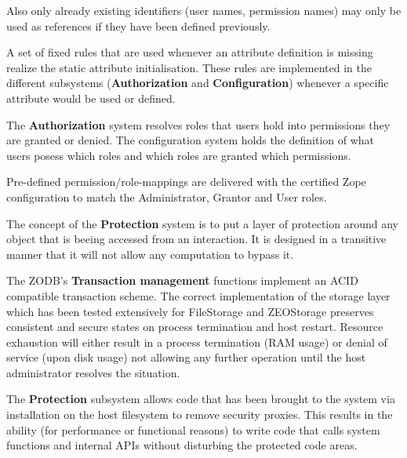 \documentclass[12pt,english]{scrbook}
\begin{document}
Also only already existing identifiers (user names, permission names) may only
be used as references if they have been defined previously.


A set of fixed rules that are used whenever an attribute definition is missing
realize the static attribute initialisation. These rules are implemented in the
different subsystems (\textbf{Authorization} and \textbf{Configuration})
whenever a specific attribute would be used or defined.


The \textbf{Authorization} system resolves roles that users hold into
permissions they are granted or denied. The configuration system holds the
definition of what users posess which roles and which roles are granted which
permissions.

Pre-defined permission/role-mappings are delivered with the certified Zope
configuration to match the Administrator, Grantor and User roles. 


The concept of the \textbf{Protection} system is to put a layer of protection
around any object that is beeing accessed from an interaction. It is designed
in a transitive manner that it will not allow any computation to bypass it.


The ZODB's \textbf{Transaction management} functions implement an ACID
compatible transaction scheme. The correct implementation of the storage layer
which has been tested extensively for FileStorage and ZEOStorage preserves
consistent and secure states on process termination and host restart. Resource
exhaustion will either result in a process termination (RAM usage) or denial of
service (upon disk usage) not allowing any further operation until the host
administrator resolves the situation.


The \textbf{Protection} subsystem allows code that has been brought to the
system via installation on the host filesystem to remove security proxies. This
results in the ability (for performance or functional reasons) to write code
that calls system functions and internal APIs without disturbing the protected
code areas.
\end{document}
